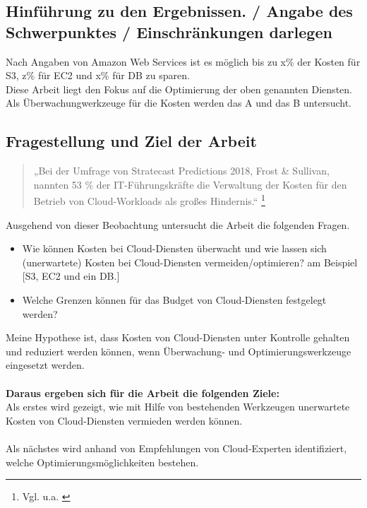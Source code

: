 \subsection{Hinführung zu den Ergebnissen. / Angabe des Schwerpunktes / Einschränkungen darlegen}
Nach Angaben von Amazon Web Services ist es möglich bis zu x\% der Kosten für S3, z\% für EC2 und x\% für DB zu sparen.
\\
Diese Arbeit liegt den Fokus auf die Optimierung der oben genannten Diensten.
Als Überwachungwerkzeuge für die Kosten werden das A und das B untersucht. 
\\
\subsection{Fragestellung und Ziel der Arbeit}
\begin{quote}
„Bei der Umfrage von Stratecast Predictions 2018, Frost \& Sullivan, nannten 53 \% der IT-Führungskräfte die Verwaltung der Kosten für den Betrieb von Cloud-Workloads als großes Hindernis.“  
\footnote{Vgl. u.a. \cite{SP1}}
\end{quote}
Ausgehend von dieser Beobachtung untersucht die Arbeit die folgenden Fragen. 
\begin{itemize}
    \item
        Wie können Kosten bei Cloud-Diensten überwacht und wie lassen sich (unerwartete) Kosten bei Cloud-Diensten vermeiden/optimieren? am Beispiel [S3, EC2 und ein DB.]
    \item
        Welche Grenzen können für das Budget von Cloud-Diensten festgelegt werden?
\end{itemize}
Meine Hypothese ist, dass Kosten von Cloud-Diensten unter Kontrolle gehalten und
reduziert werden können, wenn Überwachung- und Optimierungswerkzeuge eingesetzt werden.
\\\\
\textbf{Daraus ergeben sich für die Arbeit die folgenden Ziele:}\\ 
Als erstes wird gezeigt, wie mit Hilfe von bestehenden Werkzeugen unerwartete Kosten von Cloud-Diensten vermieden werden können.\\\\
Als nächstes wird anhand von Empfehlungen von Cloud-Experten identifiziert, welche Optimierungsmöglichkeiten bestehen.\\
\newpage
